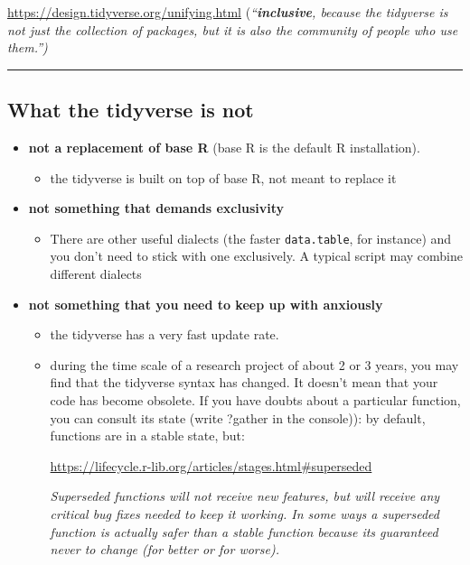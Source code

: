 \documentclass[
]{article}
\providecommand{\tightlist}{%
  \setlength{\itemsep}{0pt}\setlength{\parskip}{0pt}}
\begin{document}
\url{https://design.tidyverse.org/unifying.html}
(\emph{``\textbf{inclusive}, because the tidyverse is not just the
collection of packages, but it is also the community of people who use
them.'')}

\begin{center}\rule{0.5\linewidth}{0.5pt}\end{center}

\hypertarget{what-the-tidyverse-is-not}{%
\subsection{What the tidyverse is not}\label{what-the-tidyverse-is-not}}

\begin{itemize}
\item
  \textbf{not a replacement of base R} (base R is the default R
  installation).

  \begin{itemize}
  \tightlist
  \item
    the tidyverse is built on top of base R, not meant to replace it
  \end{itemize}
\item
  \textbf{not something that demands exclusivity}

  \begin{itemize}
  \tightlist
  \item
    There are other useful dialects (the faster \texttt{data.table}, for
    instance) and you don't need to stick with one exclusively. A
    typical script may combine different dialects
  \end{itemize}
\item
  \textbf{not something that you need to keep up with anxiously}

  \begin{itemize}
  \item
    the tidyverse has a very fast update rate.
  \item
    during the time scale of a research project of about 2 or 3 years,
    you may find that the tidyverse syntax has changed. It doesn't mean
    that your code has become obsolete. If you have doubts about a
    particular function, you can consult its state (write ?gather in the
    console)): by default, functions are in a stable state, but:

    \url{https://lifecycle.r-lib.org/articles/stages.html\#superseded}

    \emph{Superseded functions will not receive new features, but will
    receive any critical bug fixes needed to keep it working. In some
    ways a superseded function is actually safer than a stable function
    because it\textquotesingle s guaranteed never to change (for better
    or for worse).}
  \end{itemize}
\end{itemize}
\end{document}
